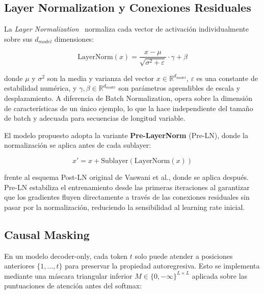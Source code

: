\subsection{Layer Normalization y Conexiones Residuales}

La \textit{Layer Normalization}~\cite{ba2016layer} normaliza cada vector de activación individualmente sobre sus $d_{model}$ dimensiones:

\begin{equation}
    \text{LayerNorm}(x) = \frac{x - \mu}{\sqrt{\sigma^2 + \varepsilon}} \cdot \gamma + \beta
\end{equation}

donde $\mu$ y $\sigma^2$ son la media y varianza del vector $x \in \mathbb{R}^{d_{model}}$, $\varepsilon$ es una constante de estabilidad numérica, y $\gamma, \beta \in \mathbb{R}^{d_{model}}$ son parámetros aprendibles de escala y desplazamiento. A diferencia de Batch Normalization, opera sobre la dimensión de características de un único ejemplo, lo que la hace independiente del tamaño de batch y adecuada para secuencias de longitud variable.

El modelo propuesto adopta la variante \textbf{Pre-LayerNorm} (Pre-LN), donde la normalización se aplica antes de cada sublayer:

\begin{equation}
    x' = x + \text{Sublayer}(\text{LayerNorm}(x))
\end{equation}

frente al esquema Post-LN original de Vaswani et al., donde se aplica después. Pre-LN estabiliza el entrenamiento desde las primeras iteraciones al garantizar que los gradientes fluyen directamente a través de las conexiones residuales sin pasar por la normalización, reduciendo la sensibilidad al learning rate inicial.

\subsection{Causal Masking}

En un modelo decoder-only, cada token $t$ solo puede atender a posiciones anteriores $\{1, \ldots, t\}$ para preservar la propiedad autoregresiva. Esto se implementa mediante una máscara triangular inferior $M \in \{0, -\infty\}^{L \times L}$ aplicada sobre las puntuaciones de atención antes del softmax:

